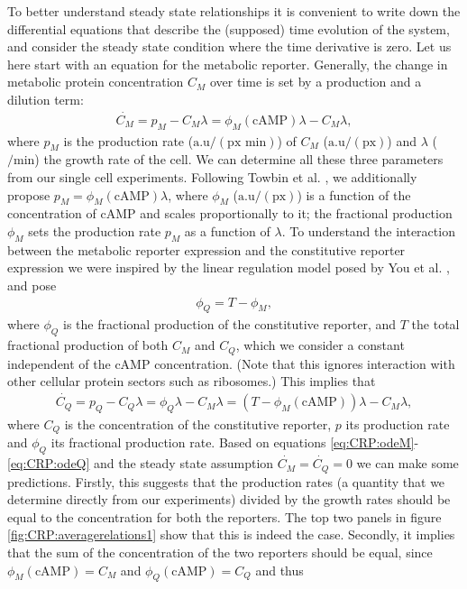 To better understand steady state relationships it is convenient to write down the differential equations that describe the (supposed) time evolution of the system, 
and consider the steady state condition where the time derivative is zero.
%
Let us here start with an equation for the metabolic reporter.
%
Generally, the change in metabolic protein concentration $C_M$ over time is set by a production and a dilution term:
\begin{align}
	\label{eq:CRP:odeM}
	\dot{C_M} = p_M - C_M \lambda = \phi_M(\text{cAMP}) \lambda -  C_M \lambda
	,
\end{align}
% 
where $p_M$ is the production rate ($\text{a.u}/(\text{px min})$) of $C_M$ ($\text{a.u}/(\text{px})$) and $\lambda$ ($/\text{min}$) the growth rate of the cell.
We can determine all these three parameters from our single cell experiments.
Following Towbin et al. \cite{Towbin2017}, we additionally propose $p_M = \phi_M(\text{cAMP}) \lambda$, where $\phi_M$ ($\text{a.u}/(\text{px})$) is a function of the concentration of cAMP and scales proportionally to it; the fractional production $\phi_M$ sets the production rate $p_M$ as a function of $\lambda$.
%
To understand the interaction between the metabolic reporter expression and the constitutive reporter expression we were inspired by the linear regulation model posed by You et al. \cite{You2013}, and pose
\begin{align}
	\label{eq:CRP:relationMQ}
	\phi_Q = T - \phi_M
	,
\end{align}
where $\phi_Q$ is the fractional production of the constitutive reporter, and $T$ the total fractional production of both $C_M$ and $C_Q$, which we consider a constant independent of the cAMP concentration. 
(Note that this ignores interaction with other cellular protein sectors such as ribosomes.) 
%
This implies that
\begin{align}
	\label{eq:CRP:odeQ}
	\dot{C_Q} = p_Q - C_Q \lambda = \phi_Q \lambda -  C_M \lambda = (T - \phi_M(\text{cAMP})) \lambda -  C_M \lambda
	,
\end{align}
where $C_Q$ is the concentration of the constitutive reporter, $p$ its production rate and $\phi_Q$ its fractional production rate.
%
Based on equations \ref{eq:CRP:odeM}-\ref{eq:CRP:odeQ} and the steady state assumption $\dot{C_M}=\dot{C_Q}=0$ we can make some predictions. Firstly, this suggests that the production rates (a quantity that we determine directly from our experiments) divided by the growth rates should be equal to the concentration for both the reporters. The top two panels in figure \ref{fig:CRP:averagerelations1} show that this is indeed the case. Secondly, it implies that the sum of the concentration of the two reporters should be equal, since $\phi_M(\text{cAMP}) = C_M$ and $\phi_Q(\text{cAMP}) = C_Q$ and thus 
